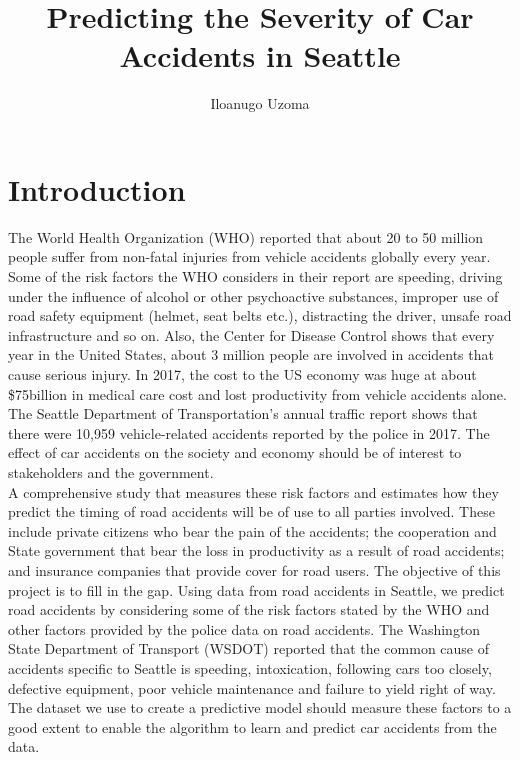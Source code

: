 \documentclass[a4paper,12pt]{article}
\author{Iloanugo Uzoma}
\title{Predicting the Severity of Car Accidents in Seattle}
\begin{document}
\maketitle

\section{Introduction}
The World Health Organization (WHO) reported that about 20 to 50 million people suffer from non-fatal injuries from vehicle accidents globally every year. Some of the risk factors the WHO considers in their report are speeding, driving under the influence of alcohol or other psychoactive substances, improper use of road safety equipment (helmet, seat belts etc.), distracting the driver, unsafe road infrastructure and so on. Also, the Center for Disease Control shows that every year in the United States, about 3 million people are involved in accidents that cause serious injury. In 2017, the cost to the US economy was huge at about \$75billion in medical care cost and lost productivity from vehicle accidents alone. The Seattle Department of Transportation’s annual traffic report shows that there were 10,959 vehicle-related accidents reported by the police in 2017. The effect of car accidents on the society and economy should be of interest to stakeholders and the government.\\

A comprehensive study that measures these risk factors and estimates how they predict the timing of road accidents will be of use to all parties involved. These include private citizens who bear the pain of the accidents; the cooperation and State government that bear the loss in productivity as a result of road accidents; and insurance companies that provide cover for road users. The objective of this project is to fill in the gap. Using data from road accidents in Seattle, we predict road accidents by considering some of the risk factors stated by the WHO and other factors provided by the police data on road accidents. The Washington State Department of Transport (WSDOT) reported that the common cause of accidents specific to Seattle is speeding, intoxication, following cars too closely, defective equipment, poor vehicle maintenance and failure to yield right of way. The dataset we use to create a predictive model should measure these factors to a good extent to enable the algorithm to learn and predict car accidents from the data.
\end{document}
